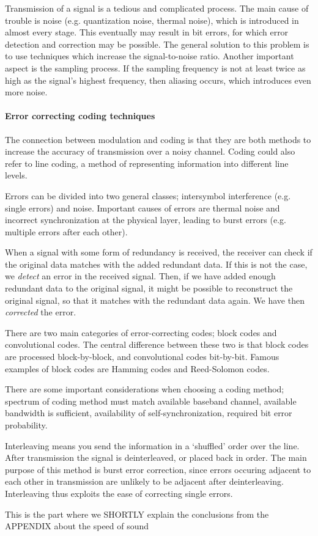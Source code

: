 \documentclass[11pt,titlepage]{report}
\begin{document}
Transmission of a signal is a tedious and complicated process. The main cause of trouble is noise (e.g. quantization noise, thermal noise), which is introduced in almost every stage. This eventually may result in bit errors, for which error detection and correction may be possible. The general solution to this problem is to use techniques which increase the signal-to-noise ratio. Another important aspect is the sampling process. If the sampling frequency is not at least twice as high as the signal's highest frequency, then aliasing occurs, which introduces even more noise.

\paragraph{Error correcting coding techniques}
The connection between modulation and coding is that they are both methods to increase the accuracy of transmission over a noisy channel. Coding could also refer to line coding, a method of representing information into different line levels.

Errors can be divided into two general classes; intersymbol interference (e.g. single errors) and noise. Important causes of errors are thermal noise and incorrect synchronization at the physical layer, leading to burst errors (e.g. multiple errors after each other).

When a signal with some form of redundancy is received, the receiver can check if the original data matches with the added redundant data. If this is not the case, we \emph{detect} an error in the received signal. Then, if we have added enough redundant data to the original signal, it might be possible to reconstruct the original signal, so that it matches with the redundant data again. We have then \emph{corrected} the error.

There are two main categories of error-correcting codes; block codes and convolutional codes. The central difference between these two is that block codes are processed block-by-block, and convolutional codes bit-by-bit. Famous examples of block codes are Hamming codes and Reed-Solomon codes. 

There are some important considerations when choosing a coding method; spectrum of coding method must match available baseband channel, available bandwidth is sufficient, availability of self-synchronization, required bit error probability.

Interleaving means you send the information in a `shuffled' order over the line. After transmission the signal is deinterleaved, or placed back in order. The main purpose of this method is burst error correction, since errors occuring adjacent to each other in transmission are unlikely to be adjacent after deinterleaving. Interleaving thus exploits the ease of correcting single errors.

This is the part where we SHORTLY explain the conclusions from the APPENDIX about the speed of sound 
\end{document}
